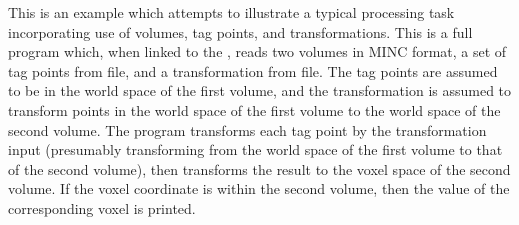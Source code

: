 This is an example which attempts to illustrate a typical processing
task incorporating use of volumes, tag points, and transformations.
This is a full program which, when linked to the \vol,
reads two volumes in MINC format, a set of tag points from file, and a
transformation from file.  The tag points are assumed to be in the
world space of the first volume, and the transformation is assumed to
transform points in the world space of the first volume to the world
space of the second volume.  The program transforms each tag point by
the transformation input (presumably transforming from the world space
of the first volume to that of the second volume), then transforms the
result to the voxel space of the second volume.  If the
voxel coordinate is within the second volume, then the value of the
corresponding voxel is printed.

